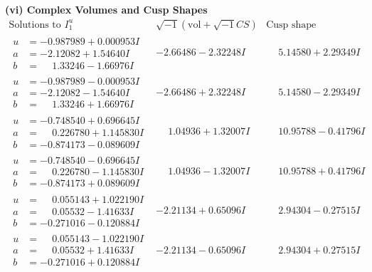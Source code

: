 \documentclass[1p]{elsarticle_modified}
\theoremstyle{definition}
\newcommand{\I}{\sqrt{-1}}
\begin{document}
\newpage\flushleft \textbf{(vi) Complex Volumes and Cusp Shapes}
$$\begin{array}{c|c|c}  
\text{Solutions to }I^u_{1}& \I (\text{vol} + \sqrt{-1}CS) & \text{Cusp shape}\\
 \hline 
\begin{aligned}
u &= -0.987989 + 0.000953 I \\
a &= -2.12082 + 1.54640 I \\
b &= \phantom{-}1.33246 - 1.66976 I\end{aligned}
 & -2.66486 - 2.32248 I & \phantom{-}5.14580 + 2.29349 I \\ \hline\begin{aligned}
u &= -0.987989 - 0.000953 I \\
a &= -2.12082 - 1.54640 I \\
b &= \phantom{-}1.33246 + 1.66976 I\end{aligned}
 & -2.66486 + 2.32248 I & \phantom{-}5.14580 - 2.29349 I \\ \hline\begin{aligned}
u &= -0.748540 + 0.696645 I \\
a &= \phantom{-}0.226780 + 1.145830 I \\
b &= -0.874173 - 0.089609 I\end{aligned}
 & \phantom{-}1.04936 + 1.32007 I & \phantom{-}10.95788 - 0.41796 I \\ \hline\begin{aligned}
u &= -0.748540 - 0.696645 I \\
a &= \phantom{-}0.226780 - 1.145830 I \\
b &= -0.874173 + 0.089609 I\end{aligned}
 & \phantom{-}1.04936 - 1.32007 I & \phantom{-}10.95788 + 0.41796 I \\ \hline\begin{aligned}
u &= \phantom{-}0.055143 + 1.022190 I \\
a &= \phantom{-}0.05532 - 1.41633 I \\
b &= -0.271016 - 0.120884 I\end{aligned}
 & -2.21134 + 0.65096 I & \phantom{-}2.94304 - 0.27515 I \\ \hline\begin{aligned}
u &= \phantom{-}0.055143 - 1.022190 I \\
a &= \phantom{-}0.05532 + 1.41633 I \\
b &= -0.271016 + 0.120884 I\end{aligned}
 & -2.21134 - 0.65096 I & \phantom{-}2.94304 + 0.27515 I \\ \hline\begin{aligned}

\end{aligned}
\end{array}$$
\end{document}
